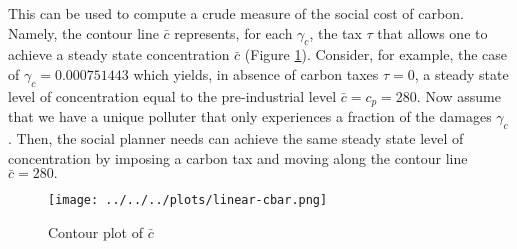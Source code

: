 \documentclass[../../main.tex]{subfiles}
\begin{document}
This can be used to compute a crude measure of the social cost of carbon. Namely, the contour line $\bar{c}$ represents, for each $\gamma_c$, the tax $\tau$ that allows one to achieve a steady state concentration $\bar{c}$ (Figure \ref{fig:linear-cbar}). Consider, for example, the case of $\gamma_c = 0.000751443$ which yields, in absence of carbon taxes $\tau = 0$, a steady state level of concentration equal to the pre-industrial level $\bar{c} = c_p = 280$. Now assume that we have a unique polluter that only experiences a fraction of the damages $\gamma_c$. Then, the social planner needs can achieve the same steady state level of concentration by imposing a carbon tax and moving along the contour line $\bar{c} = 280.$

\begin{figure}[H]
    \centering
    \texttt{[image: ../../../plots/linear-cbar.png]}
    \caption{Contour plot of $\bar{c}$}
    \label{fig:linear-cbar}
\end{figure}
\end{document}
